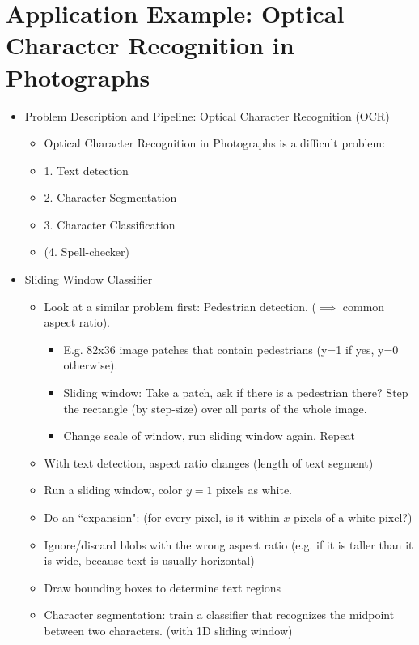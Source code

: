 \documentclass[letterpaper,10pt]{article}
\begin{document}
\section{Application Example: Optical Character Recognition in Photographs}

\begin{itemize}
\item Problem Description and Pipeline: Optical Character Recognition (OCR)
	\begin{itemize}
	\item Optical Character Recognition in Photographs is a difficult problem:
	\item 1. Text detection
	\item 2. Character Segmentation
	\item 3. Character Classification
	\item (4. Spell-checker)
	\end{itemize}

\item Sliding Window Classifier
	\begin{itemize}
	\item Look at a similar problem first: Pedestrian detection. ($\implies$ common aspect ratio).
		\begin{itemize}
		\item E.g. 82x36 image patches that contain pedestrians (y=1 if yes, y=0 otherwise).
		\item Sliding window: Take a patch, ask if there is a pedestrian there? Step the rectangle (by step-size) over all parts of the whole image.
		\item Change scale of window, run sliding window again. Repeat
		\end{itemize}
	\item With text detection, aspect ratio changes (length of text segment)
	\item Run a sliding window, color $y=1$ pixels as white.
	\item Do an ``expansion": (for every pixel, is it within $x$ pixels of a white pixel?)
	\item Ignore/discard blobs with the wrong aspect ratio (e.g. if it is taller than it is wide, because text is usually horizontal)
	\item Draw bounding boxes to determine text regions
	\item Character segmentation: train a classifier that recognizes the midpoint between two characters. (with 1D sliding window)
	\end{itemize}


\end{itemize}
\end{document}
